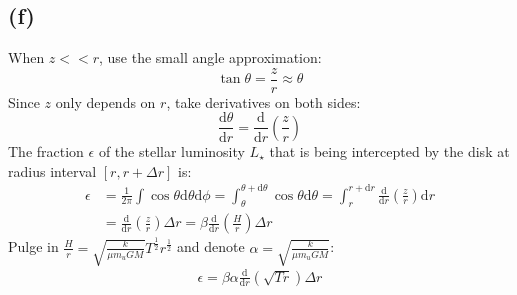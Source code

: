 \documentclass[a4paper,12pt]{article}
\renewcommand{\d}{\mathrm{d}}
\begin{document}
\subsection*{(f)}
When $z<<r$, use the small angle approximation:
\begin{equation*}
    \tan \theta = \frac{z}{r} \approx \theta
\end{equation*}
Since $z$ only depends on $r$, take derivatives on both sides:
\begin{equation*}
    \frac{\text{d} \theta}{\text{d} r} = \frac{\text{d} }{\text{d} r} (\frac{z}{r})
\end{equation*}
The fraction $\epsilon$ of the stellar luminosity $L_\star$ that is being intercepted 
by the disk at radius interval $[r, r + \Delta r]$ is:
\begin{align*}
    \epsilon &= \frac{1}{2\pi} \int \cos \theta \text{d} \theta \text{d} \phi 
    = \int_{\theta}^{\theta + \text{d} \theta} \cos \theta \text{d} \theta 
    = \int_{r}^{r + \text{d} r} \frac{\text{d} }{\mathrm{d} r} (\frac{z}{r}) \text{d}r \\
    &= \frac{\text{d} }{\mathrm{d} r} (\frac{z}{r}) \Delta r
    = \beta \frac{\text{d} }{\mathrm{d} r} (\frac{H}{r}) \Delta r
\end{align*}
Pulge in $\frac{H}{r} = \sqrt{\frac{k}{\mu m_u G M}} T^{\frac{1}{2}} r^{\frac{1}{2}}$ and denote $\alpha = \sqrt{\frac{k}{\mu m_u G M}}$:
\begin{align*}
    \epsilon = \beta \alpha \frac{\d }{\d r} (\sqrt{T r}) \Delta r
\end{align*}
\end{document}
